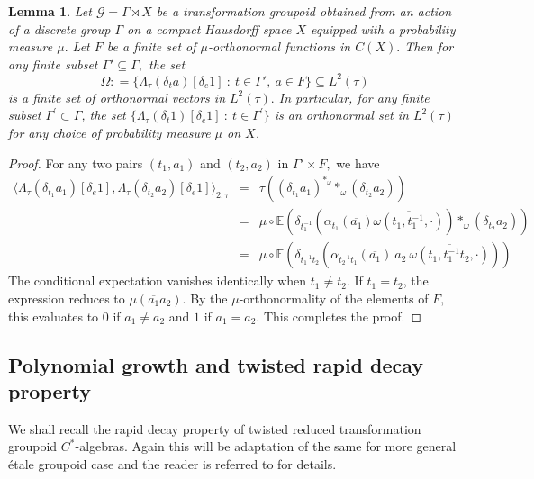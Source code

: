 \documentclass[a4paper,11pt,reqno]{amsart}
\theoremstyle{plain}
\newtheorem{lem}[thm]{Lemma}
\theoremstyle{mainthmstyle}
\theoremstyle{named}
\numberwithin{equation}{section}
\newcommand{\Bea}{\begin{eqnarray*}}
\newcommand{\Eea}{\end{eqnarray*}}
\begin{document}
\begin{lem}
\label{Voiculescu_orthonormal}
Let $\mathcal G = \Gamma \rtimes X$ be a transformation groupoid obtained from an action of a discrete group $\Gamma$ on a compact Hausdorff space $X$ equipped with a probability measure $\mu.$ Let $F$ be a finite set of $\mu$-orthonormal functions in $C (X).$ Then for any finite subset $\Gamma' \subseteq \Gamma,$ the set $$\Omega :  = \{\Lambda_{\tau} (\delta_t a)[\delta_e 1]\ :\ t \in \Gamma',\ a \in F \} \subseteq L^2(\tau)$$ is a finite set of orthonormal vectors in $L^{2} (\tau).$ In particular, for any finite subset $\Gamma^{\prime}\subset\Gamma$, the set $\{\Lambda_{\tau} (\delta_t 1)[\delta_e 1]\ :\ t \in \Gamma^{\prime}\}$ is an orthonormal set in $L^{2}(\tau)$ for any choice of probability measure $\mu$ on $X$. 
\end{lem}

\begin{proof}
For any two pairs $\left (t_1, a_1 \right )$ and $\left (t_2, a_2 \right )$ in $\Gamma' \times F,$ we have
\Bea
\langle \Lambda_\tau(\delta_{t_1} a_{1})[\delta_e 1], \Lambda_\tau(\delta_{t_2} a_{2})[\delta_e 1] \rangle_{2, \tau} 
& = & \tau \left( (\delta_{t_1} a_{1})^{\ast_{\omega}} \ast_{\omega} \left (\delta_{t_2} a_{2} \right ) \right) \\
& = & \mu \circ \mathbb{E} \left(\delta_{t_1^{-1}} \left (\alpha_{t_1} \left (\overline {a_{1}} \right ) \overline {\omega \left (t_1, t_1^{-1}, \cdot \right )} \right ) \ast_{\omega} \left (\delta_{t_2} a_{2} \right ) \right ) \\ & = & \mu \circ \mathbb {E} \left (\delta_{t_1^{-1} t_2} \left( \alpha_{t_2^{-1} t_1}(\overline{a_{1}})\ a_{2}\ \overline{\omega(t_1, t_1^{-1} t_2, \cdot)} \right) \right )
\Eea
The conditional expectation vanishes identically when $t_1 \neq t_2$. If $t_1 = t_2$, the expression reduces to $\mu(\overline {a_{1}} a_{2})$. By the $\mu$-orthonormality of the elements of $F,$ this evaluates to $0$ if $a_1 \neq a_2$ and $1$ if $a_1 = a_2.$ This completes the proof.
\end{proof}

\subsection{Polynomial growth and twisted rapid decay property} We shall recall the rapid decay property of twisted reduced transformation groupoid $C^{\ast}$-algebras. Again this will be adaptation of the same for more general \'etale groupoid case and the reader is referred to \cite{Weygandt-2024-Rapid-decay-for-etale-gpd} for details.
\end{document}
